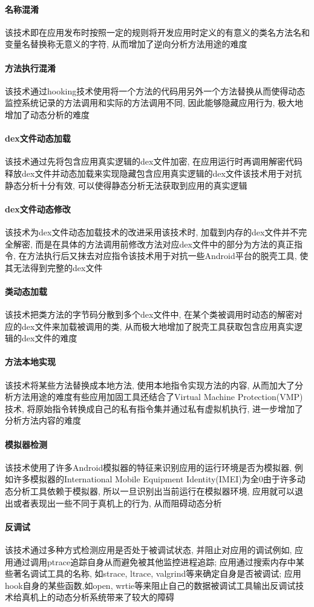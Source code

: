 \paragraph*{名称混淆}
该技术即在应用发布时按照一定的规则将开发应用时定义的有意义的类名\dunhao 方法名\dunhao 和变量名替换称无意义的字符, 从而增加了逆向分析方法用途的难度\juhao

\paragraph*{方法执行混淆}
该技术通过hooking技术使用将一个方法的代码用另外一个方法替换从而使得动态监控系统记录的方法调用和实际的方法调用不同, 因此能够隐藏应用行为, 极大地增加了动态分析的难度\juhao

\paragraph*{dex文件动态加载}
该技术通过先将包含应用真实逻辑的dex文件加密, 在应用运行时再调用解密代码释放dex文件并动态加载来实现隐藏包含应用真实逻辑的dex文件\juhao 该技术用于对抗静态分析十分有效, 可以使得静态分析无法获取到应用的真实逻辑\juhao

\paragraph*{dex文件动态修改}
该技术为dex文件动态加载技术的改进\juhao 采用该技术时, 加载到内存的dex文件并不完全解密, 而是在具体的方法调用前修改方法对应dex文件中的部分为方法的真正指令, 在方法执行后又抹去对应指令\juhao 该技术用于对抗一些Android平台的脱壳工具, 使其无法得到完整的dex文件\juhao

\paragraph*{类动态加载}
该技术把类方法的字节码分散到多个dex文件中, 在某个类被调用时动态的解密对应的dex文件来加载被调用的类, 从而极大地增加了脱壳工具获取包含应用真实逻辑的dex文件的难度\juhao

\paragraph*{方法本地实现}
该技术将某些方法替换成本地方法, 使用本地指令实现方法的内容, 从而加大了分析方法用途的难度\juhao 有些应用加固工具还结合了Virtual Machine Protection(VMP)技术, 将原始指令转换成自己的私有指令集并通过私有虚拟机执行, 进一步增加了分析方法内容的难度\juhao

\paragraph*{模拟器检测}
该技术使用了许多Android模拟器的特征来识别应用的运行环境是否为模拟器, 例如许多模拟器的International Mobile Equipment Identity(IMEI)为全0\juhao 由于许多动态分析工具依赖于模拟器, 所以一旦识别出当前运行在模拟器环境, 应用就可以退出或者表现出一些不同于真机上的行为, 从而阻碍动态分析\juhao

\paragraph*{反调试}
该技术通过多种方式检测应用是否处于被调试状态, 并阻止对应用的调试\juhao 例如, 应用通过调用ptrace追踪自身从而避免被其他监控进程追踪; 应用通过搜索内存中某些著名调试工具的名称, 如strace, ltrace, valgrind等来确定自身是否被调试; 应用hook自身的某些函数,如open, wrtie等来阻止自己的数据被调试工具输出\juhao 反调试技术给真机上的动态分析系统带来了较大的障碍\juhao




